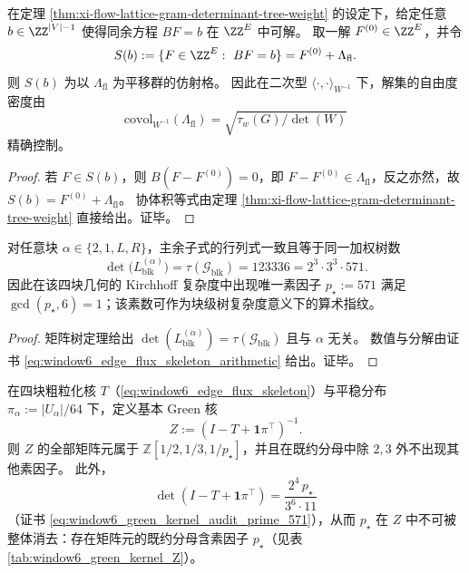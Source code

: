 \begin{corollary}[固定边界偏差后的整数流扭量协体积]\label{cor:xi-affine-flow-torsor-covolume}
在定理 \ref{thm:xi-flow-lattice-gram-determinant-tree-weight} 的设定下，给定任意 \(b\in\ZZ^{|V|-1}\) 使得同余方程 \(BF=b\) 在 \(\ZZ^E\) 中可解。
取一解 \(F^{(0)}\in\ZZ^E\)，并令
\[
S(b):=\{F\in\ZZ^E:\ BF=b\}=F^{(0)}+\Lambda_{\mathrm{fl}}.
\]
则 \(S(b)\) 为以 \(\Lambda_{\mathrm{fl}}\) 为平移群的仿射格。
因此在二次型 \(\langle\cdot,\cdot\rangle_{W^{-1}}\) 下，解集的自由度密度由
\[
\mathrm{covol}_{W^{-1}}(\Lambda_{\mathrm{fl}})=\sqrt{\tau_w(G)/\det(W)}
\]
精确控制。
\end{corollary}
\begin{proof}
若 \(F\in S(b)\)，则 \(B(F-F^{(0)})=0\)，即 \(F-F^{(0)}\in\Lambda_{\mathrm{fl}}\)，反之亦然，故 \(S(b)=F^{(0)}+\Lambda_{\mathrm{fl}}\)。
协体积等式由定理 \ref{thm:xi-flow-lattice-gram-determinant-tree-weight} 直接给出。证毕。
\end{proof}

\begin{corollary}[window-\(6\) 四块商图的加权树数分解与审计素数 \texorpdfstring{$p_\star=571$}{p*=571}]\label{cor:xi-window6-block-tree-number-audit-prime}
对任意块 \(\alpha\in\{2,1,L,R\}\)，主余子式的行列式一致且等于同一加权树数
\[
\det\!\bigl(L_{\mathrm{blk}}^{(\alpha)}\bigr)
=\tau(\mathcal{G}_{\mathrm{blk}})
=123336
=2^{3}\cdot 3^{3}\cdot 571.
\]
因此在该四块几何的 Kirchhoff 复杂度中出现唯一素因子 \(p_\star:=571\) 满足 \(\gcd(p_\star,6)=1\)；该素数可作为块级树复杂度意义下的算术指纹。
\end{corollary}

\begin{proof}
矩阵树定理给出 \(\det(L_{\mathrm{blk}}^{(\alpha)})=\tau(\mathcal{G}_{\mathrm{blk}})\) 且与 \(\alpha\) 无关。
数值与分解由证书 \eqref{eq:window6_edge_flux_skeleton_arithmetic} 给出。证毕。
\end{proof}

\begin{proposition}\label{prop:xi-window6-green-kernel-arithmetic-audit-prime}
在四块粗粒化核 \(T\)（\eqref{eq:window6_edge_flux_skeleton}）与平稳分布
\(
\pi_\alpha:=|U_\alpha|/64
\)
下，定义基本 Green 核
\[
Z:=(I-T+\mathbf 1\pi^\top)^{-1}.
\]
则 \(Z\) 的全部矩阵元属于 \(\mathbb{Z}[1/2,1/3,1/p_\star]\)，并且在既约分母中除 \(2,3\) 外不出现其他素因子。
此外，
\[
\det(I-T+\mathbf 1\pi^\top)=\frac{2^{4}\,p_\star}{3^{6}\cdot 11}
\]
（证书 \eqref{eq:window6_green_kernel_audit_prime_571}），从而 \(p_\star\) 在 \(Z\) 中不可被整体消去：存在矩阵元的既约分母含素因子 \(p_\star\)（见表 \ref{tab:window6_green_kernel_Z}）。
\end{proposition}

